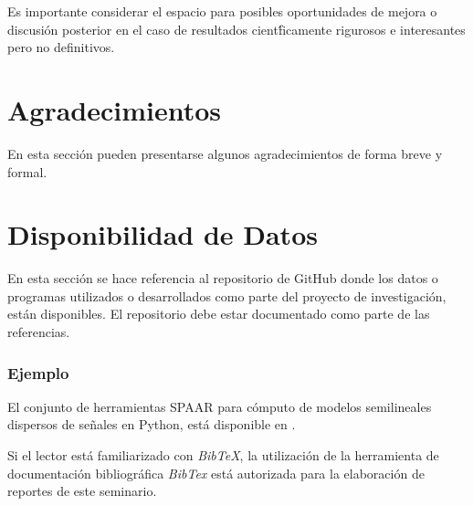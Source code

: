 \documentclass[peerreview]{IEEEtran}
\begin{document}
Es importante considerar el espacio para posibles oportunidades de mejora o discusi\'on posterior en el caso de resultados cient\'ficamente rigurosos e interesantes pero no definitivos.

\section*{Agradecimientos}

En esta secci\'on pueden presentarse algunos agradecimientos de forma breve y formal.

\section*{Disponibilidad de Datos}

En esta secci\'on se hace referencia al repositorio de GitHub donde los datos o programas utilizados o desarrollados como parte del proyecto de investigaci\'on, est\'an disponibles. El repositorio debe estar documentado como parte de las referencias. 

\subsubsection*{Ejemplo} El conjunto de herramientas SPAAR para c\'omputo de modelos semilineales dispersos de se\~nales en Python, est\'a disponible en \cite{SPAAR}.

Si el lector est\'a familiarizado con {\em BibTeX}, la utilizaci\'on de la herramienta de documentaci\'on bibliogr\'afica {\em BibTex} est\'a autorizada para la elaboraci\'on de reportes de este seminario.


\end{document}
